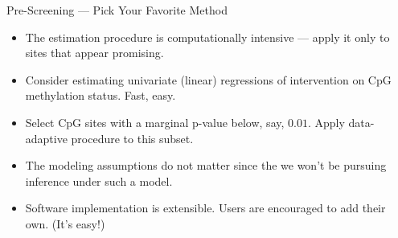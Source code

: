 \documentclass[12pt,t,handout]{beamer}
\begin{document}
\begin{frame}[c]{Pre-Screening --- Pick Your Favorite Method}

\begin{center}
\begin{itemize}
  \itemsep10pt
  \item The estimation procedure is computationally intensive --- apply it only
    to sites that appear promising.
  \item Consider estimating univariate (linear) regressions of intervention on
    CpG methylation status. Fast, easy.
  \item Select CpG sites with a marginal p-value below, say, $0.01$. Apply
    data-adaptive procedure to this subset.
  \item The modeling assumptions do not matter since the we won't be pursuing
    inference under such a model.
  \item Software implementation is extensible. Users are encouraged to add their
    own. (It's easy!)
\end{itemize}
\end{center}


\end{frame}

\end{document}
